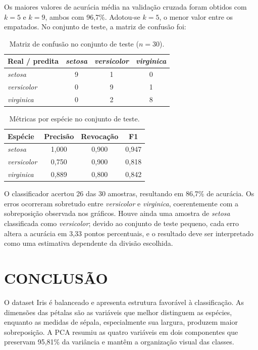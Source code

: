 \documentclass[12pt, a4paper, twoside, chapter=TITLE, subsection=TITLE,
section=TITLE, subsubsection=TITLE, english, brazil]{abntex2}
\begin{document}
Os maiores valores de acurácia média na validação cruzada foram obtidos com $k=5$ e $k=9$, ambos com 96,7\%. Adotou-se $k=5$, o menor valor entre os empatados. No conjunto de teste, a matriz de confusão foi:

\begin{table}[H]
\centering
\caption{Matriz de confusão no conjunto de teste ($n=30$).}
\label{tab:confusao}
\begin{tabular}{lccc}
\toprule
Real / predita & \textit{setosa} & \textit{versicolor} & \textit{virginica} \\
\midrule
\textit{setosa} & 9 & 1 & 0 \\
\textit{versicolor} & 0 & 9 & 1 \\
\textit{virginica} & 0 & 2 & 8 \\
\bottomrule
\end{tabular}
\end{table}

\begin{table}[H]
\centering
\caption{Métricas por espécie no conjunto de teste.}
\label{tab:metricas}
\begin{tabular}{lccc}
\toprule
Espécie & Precisão & Revocação & F1 \\
\midrule
\textit{setosa} & 1,000 & 0,900 & 0,947 \\
\textit{versicolor} & 0,750 & 0,900 & 0,818 \\
\textit{virginica} & 0,889 & 0,800 & 0,842 \\
\bottomrule
\end{tabular}
\end{table}

O classificador acertou 26 das 30 amostras, resultando em 86,7\% de acurácia. Os erros ocorreram sobretudo entre \textit{versicolor} e \textit{virginica}, coerentemente com a sobreposição observada nos gráficos. Houve ainda uma amostra de \textit{setosa} classificada como \textit{versicolor}; devido ao conjunto de teste pequeno, cada erro altera a acurácia em 3,33 pontos percentuais, e o resultado deve ser interpretado como uma estimativa dependente da divisão escolhida.

\chapter{CONCLUSÃO}
O dataset Iris é balanceado e apresenta estrutura favorável à classificação. As dimensões das pétalas são as variáveis que melhor distinguem as espécies, enquanto as medidas de sépala, especialmente sua largura, produzem maior sobreposição. A PCA resumiu as quatro variáveis em dois componentes que preservam 95,81\% da variância e mantêm a organização visual das classes.
\end{document}
